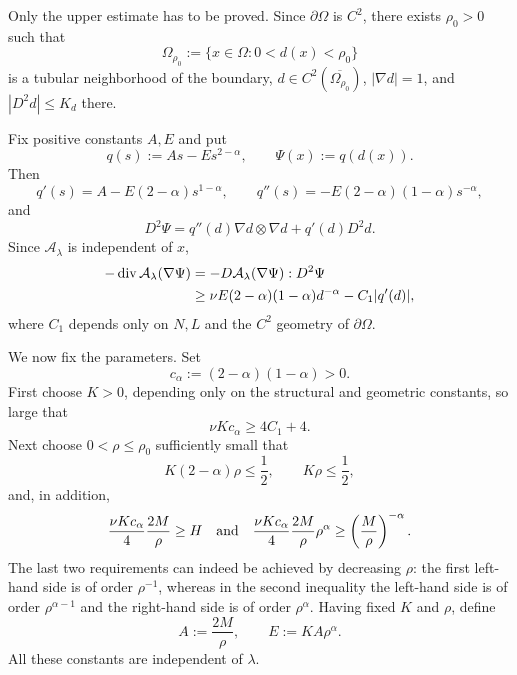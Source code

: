 \documentclass[11pt,leqno]{amsart}
\makeatletter
\renewenvironment{proof}[1][\proofname]{%
  \par
  \pushQED{\qed}%
  \normalfont
  \topsep6\p@\@plus6\p@\relax
  \trivlist
  \item[\hskip\labelsep\itshape #1\@addpunct{.}]%
  \hspace{0.5em}\ignorespaces
}{%
  \popQED
  \endtrivlist\@endpefalse
}
\makeatother
\begin{document}
\begin{proof}
Only the upper estimate has to be proved.  Since $\partial\Omega$ is
$C^2$, there exists $\rho_0>0$ such that
\[
 \Omega_{\rho_0}:=\{x\in\Omega:0<d(x)<\rho_0\}
\]
is a tubular neighborhood of the boundary,
$d\in C^2(\overline{\Omega_{\rho_0}})$, $|\nabla d|=1$, and
$|D^2d|\le K_d$ there.

Fix positive constants $A,E$ and put
\[
 q(s):=As-Es^{2-\alpha},\qquad
 \Psi(x):=q(d(x)).
\]
Then
\[
 q'(s)=A-E(2-\alpha)s^{1-\alpha},\qquad
 q''(s)=-E(2-\alpha)(1-\alpha)s^{-\alpha},
\]
and
\[
 D^2\Psi
 =
 q''(d)\nabla d\otimes\nabla d+q'(d)D^2d.
\]
Since $\mathcal A_\lambda$ is independent of $x$,
\begin{align}
 -\operatorname{div}\mathcal A_\lambda(\nabla\Psi)
 &=
 -D\mathcal A_\lambda(\nabla\Psi):D^2\Psi \notag\\
 &\ge
 \nu E(2-\alpha)(1-\alpha)d^{-\alpha}
 -C_1|q'(d)|,
 \label{eq:barrier-operator}
\end{align}
where $C_1$ depends only on $N,L$ and the $C^2$ geometry of
$\partial\Omega$.

We now fix the parameters.  Set
\[
 c_\alpha:=(2-\alpha)(1-\alpha)>0.
\]
First choose $K>0$, depending only on the structural and geometric
constants, so large that
\begin{equation}\label{eq:K-choice-final}
 \nu Kc_\alpha\ge 4C_1+4.
\end{equation}
Next choose $0<\rho\le\rho_0$ sufficiently small that
\begin{equation}\label{eq:rho-choice-final}
 K(2-\alpha)\rho\le\frac12,
 \qquad
 K\rho\le\frac12,
\end{equation}
and, in addition,
\begin{equation}\label{eq:rho-singular-choice-final}
 \frac{\nu Kc_\alpha}{4}\frac{2M}{\rho}\ge H
 \quad\hbox{and}\quad
 \frac{\nu Kc_\alpha}{4}
 \frac{2M}{\rho}\rho^\alpha
 \ge
 \left(\frac{M}{\rho}\right)^{-\alpha}.
\end{equation}
The last two requirements can indeed be achieved by decreasing
$\rho$: the first left-hand side is of order $\rho^{-1}$, whereas in
the second inequality the left-hand side is of order
$\rho^{\alpha-1}$ and the right-hand side is of order $\rho^\alpha$.
Having fixed $K$ and $\rho$, define
\begin{equation}\label{eq:AB-coupled-choice}
 A:=\frac{2M}{\rho},
 \qquad
 E:=KA\rho^\alpha.
\end{equation}
All these constants are independent of $\lambda$.


\end{proof}
\end{document}
